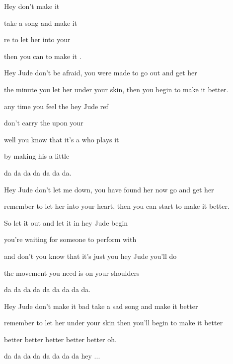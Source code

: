 

\zs
Hey  don't make it 

take a  {song} and {make} it 

re to let her into your 

then you can  to make it .
\ks

\zs
Hey Jude don't be afraid,
you were made to go out and get her

the minute you let her under your skin,
then you begin to make it better.
\ks

\zr
{} any time you feel the  hey {Jude} ref

don't {carry} the  {upon} your 

 well you know that it's a  who {plays} it 

by {making} his  a {little} 

da da da  da da da  da.
\kr

\zs
Hey Jude don't let me down,
you have found her now go and get her

remember to let her into your heart,
then you can start to make it better.
\ks

\zr
So let it out and let it in hey Jude begin

you're waiting for someone to perform with

and don't you know that it's just you hey Jude you'll do

the movement you need is on your shoulders

da da da da da da da da da.
\kr

\zs
Hey Jude don't make it bad
take a sad song and make it better

remember to let her under your skin
then you'll begin to make it better

better better better better better oh.
\ks

 da da  da da da  da da da hey  ...

\kp





